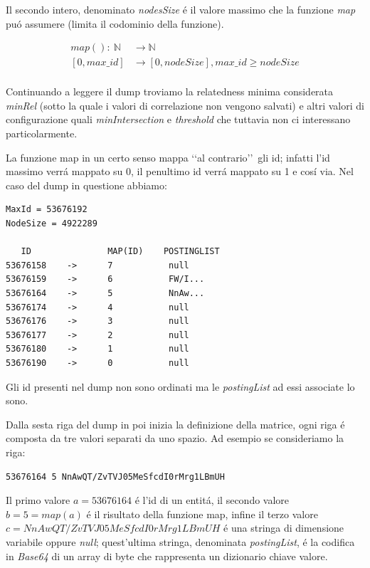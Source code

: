 Il secondo intero, denominato \textit{nodesSize} \'e il valore massimo che la funzione \textit{map} pu\'o assumere (limita il codominio della funzione).

\begin{equation}\begin{split}
    map():\ \mathbb{N} & \rightarrow \mathbb{N}\\
            [0,max\_id] & \rightarrow [0, nodeSize], max\_id \geq nodeSize\\
\end{split}\end{equation}

Continuando a leggere il dump troviamo la relatedness minima considerata \textit{minRel} (sotto la quale i valori di correlazione non vengono salvati) 
e altri valori di configurazione quali \textit{minIntersection} e \textit{threshold} che tuttavia non ci interessano particolarmente.

La funzione map in un certo senso mappa \lq\lq al contrario\rq\rq\ gli id; infatti l'id massimo verr\'a mappato su 0, il penultimo id verr\'a mappato su 1 e cos\'i via.
Nel caso del dump in questione abbiamo:

\begin{lstlisting}[style=TeXStyle]
MaxId = 53676192
NodeSize = 4922289

   ID		        MAP(ID)    POSTINGLIST
53676158    ->      7           null
53676159    ->      6           FW/I...
53676164    ->      5           NnAw...
53676174    ->      4           null
53676176    ->      3           null
53676177    ->      2           null
53676180    ->      1           null
53676190    ->      0           null
\end{lstlisting}

Gli id presenti nel dump non sono ordinati ma le \textit{postingList} ad essi associate lo sono.

Dalla sesta riga del dump in poi inizia la definizione della matrice, ogni riga \'e composta da tre valori separati da uno spazio. 
Ad esempio se consideriamo la riga:
\begin{lstlisting}[style=TeXStyle]
53676164 5 NnAwQT/ZvTVJ05MeSfcdI0rMrg1LBmUH
\end{lstlisting}

Il primo valore $a = 53676164$ \'e l'id di un entit\'a, il secondo valore $b = 5 = map(a)$ \'e il risultato della funzione map, 
infine il terzo valore $c = NnAwQT/ZvTVJ05MeSfcdI0rMrg1LBmUH$ \'e una stringa di dimensione variabile oppure \textit{null};
quest'ultima stringa, denominata \textit{postingList}, \'e la codifica in \textit{Base64} di un array di byte che rappresenta un dizionario chiave valore. 

